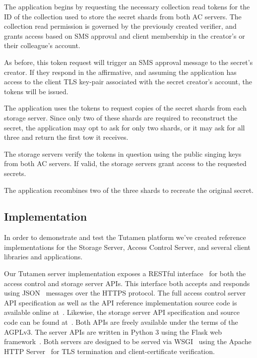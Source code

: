 \begin{packed_enum}
\item The application begins by requesting the necessary collection
  read tokens for the ID of the collection used to store the secret
  shards from both AC servers. The collection read permission is
  governed by the previously created verifier, and grants access based
  on SMS approval and client membership in the creator's or their
  colleague's account.
\item As before, this token request will trigger an SMS approval
  message to the secret's creator. If they respond in the affirmative,
  and assuming the application has access to the client TLS key-pair
  associated with the secret creator's account, the tokens will be
  issued.
\item The application uses the tokens to request copies of the secret
  shards from each storage server. Since only two of these shards are
  required to reconstruct the secret, the application may opt to ask
  for only two shards, or it may ask for all three and return the
  first tow it receives.
\item The storage servers verify the tokens in question using the
  public singing keys from both AC servers. If valid, the storage
  servers grant access to the requested secrets.
\item The application recombines two of the three shards to recreate
  the original secret.
\end{packed_enum}

\subsection{Implementation}

In order to demonstrate and test the Tutamen platform we've created
reference implementations for the Storage Server, Access Control Server,
and several client libraries and applications.

Our Tutamen server implementation exposes a RESTful
interface~\cite{fielding2000} for both the access control and storage
server APIs. This interface both accepts and responds using
JSON~\cite{json} messages over the HTTPS protocol. The full access
control server API specification as well as the API reference
implementation source code is available online
at~\cite{src-tutamen-apiaccesscontrol}. Likewise, the storage server
API specification and source code can be found
at~\cite{src-tutamen-apistorage}. Both APIs are freely available under
the terms of the AGPLv3. The server APIs are written in Python 3 using
the Flask web framework~\cite{python-flask}. Both servers are designed
to be served via WSGI~\cite{pep3333} using the Apache HTTP
Server~\cite{apache} for TLS termination and client-certificate
verification.

